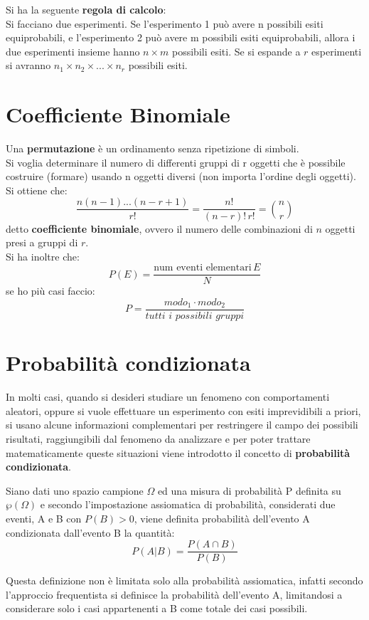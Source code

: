 \documentclass[a4paper,12pt, oneside]{book}
\begin{document}
Si ha la seguente \textbf{regola di calcolo}:\\
Si facciano due esperimenti. Se l'esperimento 1 può avere n
possibili esiti equiprobabili, e l'esperimento 2 può avere m possibili esiti equiprobabili, allora i
due esperimenti insieme hanno $n\times m$ possibili esiti.
Se si espande a $r$ esperimenti si avranno $n_1\times n_2\times ...\times n_r$ possibili esiti.
\section{Coefficiente Binomiale}
Una \textbf{permutazione} è un ordinamento senza ripetizione di simboli.\\
Si voglia determinare il numero di differenti gruppi di r oggetti che è possibile costruire
(formare) usando n oggetti diversi (non importa l’ordine degli oggetti). Si ottiene che:
\[\frac{n(n-1)...(n-r+1)}{r!}=\frac{n!}{(n-r)!\,r!}= {n\choose r}\]
detto \textbf{coefficiente binomiale}, ovvero il numero delle combinazioni di $n$ oggetti presi a gruppi di $r$.\\
Si ha inoltre che:
\[P(E)=\frac{\mbox{num eventi elementari} \, E}{N}\]
se ho più casi faccio:
\[P=\frac{modo_1\cdot modo_2}{tutti\,\, i\,\, possibili\,\, gruppi}\]

\section{Probabilità condizionata}
In molti casi, quando si desideri studiare un fenomeno con comportamenti aleatori, oppure si vuole effettuare
un esperimento con esiti imprevidibili a priori, si usano alcune informazioni complementari per restringere 
il campo dei possibili risultati, raggiungibili dal fenomeno da analizzare e per poter trattare matematicamente
queste situazioni viene introdotto il concetto di \textbf{probabilità condizionata}.

\begin{definizione}
Siano dati uno spazio campione $\Omega$ ed una misura di probabilità P definita su $\wp(\Omega)$ e
secondo l’impostazione assiomatica di probabilità, considerati due eventi, A e B con $P(B)>0$,
viene definita  probabilità dell'evento A condizionata dall'evento B la quantità:
\[P(A|B) = \frac{P(A\cap B)}{P(B)} \]
\end{definizione}
Questa definizione non è limitata solo alla probabilità assiomatica, infatti secondo l'approccio frequentista 
si definisce la probabilità dell'evento A, limitandosi a considerare solo i casi appartenenti a B come totale dei casi possibili.
\end{document}
